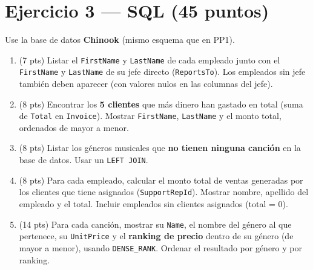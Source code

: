 \documentclass[11pt,a4paper]{article}
\begin{document}
\newpage

\section*{Ejercicio 3 — SQL \hfill\normalfont(45 puntos)}

Use la base de datos \textbf{Chinook} (mismo esquema que en PP1).

\begin{enumerate}

  \item (7 pts) Listar el \texttt{FirstName} y \texttt{LastName} de cada empleado junto con el \texttt{FirstName} y \texttt{LastName} de su jefe directo (\texttt{ReportsTo}). Los empleados sin jefe también deben aparecer (con valores nulos en las columnas del jefe).

  \vspace{4.5cm}

  \item (8 pts) Encontrar los \textbf{5 clientes} que más dinero han gastado en total (suma de \texttt{Total} en \texttt{Invoice}). Mostrar \texttt{FirstName}, \texttt{LastName} y el monto total, ordenados de mayor a menor.

  \vspace{4.5cm}

  \item (8 pts) Listar los géneros musicales que \textbf{no tienen ninguna canción} en la base de datos. Usar un \texttt{LEFT JOIN}.

  \vspace{4.5cm}

  \item (8 pts) Para cada empleado, calcular el monto total de ventas generadas por los clientes que tiene asignados (\texttt{SupportRepId}). Mostrar nombre, apellido del empleado y el total. Incluir empleados sin clientes asignados (total = 0).

  \vspace{4.5cm}

  \item (14 pts) Para cada canción, mostrar su \texttt{Name}, el nombre del género al que pertenece, su \texttt{UnitPrice} y el \textbf{ranking de precio} dentro de su género (de mayor a menor), usando \texttt{DENSE\_RANK}. Ordenar el resultado por género y por ranking.

  \vspace{5cm}

\end{enumerate}
\end{document}
